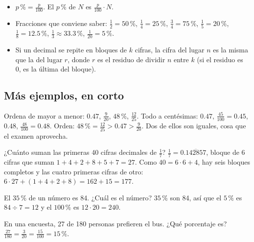 
\ejemplosdibujados

\begin{regla}
\begin{itemize}
  \item $p\,\% = \tfrac{p}{100}$. El $p\,\%$ de $N$ es $\tfrac{p}{100}\cdot N$.
  \item Fracciones que conviene saber: $\tfrac12 = 50\,\%$, $\tfrac14 = 25\,\%$, $\tfrac34 = 75\,\%$, $\tfrac15 = 20\,\%$,
  $\tfrac18 = 12.5\,\%$, $\tfrac13 \approx 33.3\,\%$, $\tfrac{1}{20} = 5\,\%$.
  \item Si un decimal se repite en bloques de $k$ cifras, la cifra del lugar $n$ es la misma que la del lugar
  $r$, donde $r$ es el residuo de dividir $n$ entre $k$ (si el residuo es 0, es la última del bloque).
\end{itemize}
\end{regla}

\subsection{Más ejemplos, en corto}
\begin{ejemplo}
Ordena de mayor a menor: $0.47$, $\tfrac{9}{20}$, $48\,\%$, $\tfrac{12}{25}$.
\solucion Todo a centésimas: $0.47$, $\tfrac{45}{100} = 0.45$, $0.48$, $\tfrac{48}{100} = 0.48$. Orden: $48\,\% =
\tfrac{12}{25} > 0.47 > \tfrac{9}{20}$. Dos de ellos son iguales, cosa que el examen aprovecha.
\end{ejemplo}

\begin{ejemplo}
¿Cuánto suman las primeras 40 cifras decimales de $\tfrac{1}{7}$?
\solucion $\tfrac17 = 0.\overline{142857}$, bloque de 6 cifras que suman $1+4+2+8+5+7 = 27$. Como $40 = 6 \cdot 6 + 4$,
hay seis bloques completos y las cuatro primeras cifras de otro: $6 \cdot 27 + (1+4+2+8) = 162 + 15 = 177$.
\end{ejemplo}

\begin{ejemplo}
El $35\,\%$ de un número es 84. ¿Cuál es el número?
\solucion $35\,\%$ son 84, así que el $5\,\%$ es $84 \div 7 = 12$ y el $100\,\%$ es $12 \cdot 20 = 240$.
\end{ejemplo}

\begin{ejemplo}
En una encuesta, 27 de 180 personas prefieren el bus. ¿Qué porcentaje es?
\solucion $\tfrac{27}{180} = \tfrac{3}{20} = \tfrac{15}{100} = 15\,\%$.
\end{ejemplo}

